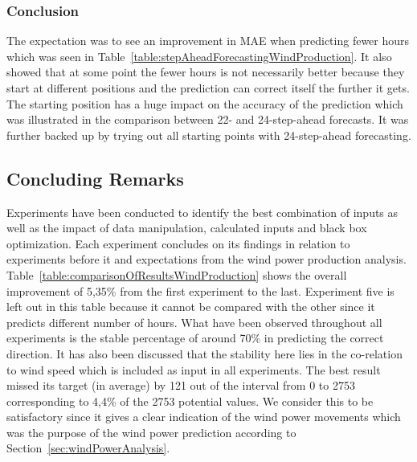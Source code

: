 
\subsubsection{Conclusion}
The expectation was to see an improvement in MAE when predicting fewer hours which was seen in Table~\ref{table:stepAheadForecastingWindProduction}. It also showed that at some point the fewer hours is not necessarily better because they start at different positions and the prediction can correct itself the further it gets. The starting position has a huge impact on the accuracy of the prediction which was illustrated in the comparison between 22- and 24-step-ahead forecasts. It was further backed up by trying out all starting points with 24-step-ahead forecasting.

\subsection{Concluding Remarks}
Experiments have been conducted to identify the best combination of inputs as well as the impact of data manipulation, calculated inputs and black box optimization. Each experiment concludes on its findings in relation to experiments before it and expectations from the wind power production analysis. Table~\ref{table:comparisonOfResultsWindProduction} shows the overall improvement of 5,35\% from the first experiment to the last. Experiment five is left out in this table because it cannot be compared with the other since it predicts different number of hours. What have been observed throughout all experiments is the stable percentage of around 70\% in predicting the correct direction. It has also been discussed that the stability here lies in the co-relation to wind speed which is included as input in all experiments. The best result missed its target (in average) by 121 out of the interval from 0 to 2753 corresponding to 4,4\% of the 2753 potential values. We consider this to be satisfactory since it gives a clear indication of the wind power movements which was the purpose of the wind power prediction according to Section~\ref{sec:windPowerAnalysis}. 

